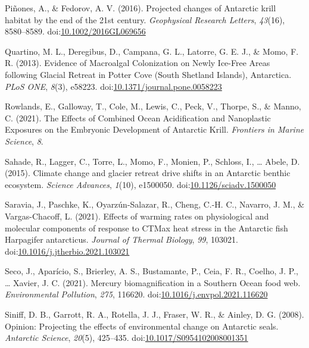 \documentclass[
]{article}
\newlength{\cslhangindent}
\newenvironment{CSLReferences}[2] %
 {\begin{list}{}{%
  \setlength{\itemindent}{0pt}
  \setlength{\leftmargin}{0pt}
  \setlength{\parsep}{0pt}
  \ifodd #1
   \setlength{\leftmargin}{\cslhangindent}
   \setlength{\itemindent}{-1\cslhangindent}
  \fi
  \setlength{\itemsep}{#2\baselineskip}}}
 {\end{list}}
\begin{document}
\begin{CSLReferences}{1}{0}
Piñones, A., \& Fedorov, A. V. (2016). Projected changes of {Antarctic}
krill habitat by the end of the 21st century. \emph{Geophysical Research
Letters}, \emph{43}(16), 8580--8589.
doi:\href{https://doi.org/10.1002/2016GL069656}{10.1002/2016GL069656}

Quartino, M. L., Deregibus, D., Campana, G. L., Latorre, G. E. J., \&
Momo, F. R. (2013). Evidence of {Macroalgal Colonization} on {Newly
Ice-Free Areas} following {Glacial Retreat} in {Potter Cove} ({South
Shetland Islands}), {Antarctica}. \emph{PLoS ONE}, \emph{8}(3), e58223.
doi:\href{https://doi.org/10.1371/journal.pone.0058223}{10.1371/journal.pone.0058223}

Rowlands, E., Galloway, T., Cole, M., Lewis, C., Peck, V., Thorpe, S.,
\& Manno, C. (2021). The {Effects} of {Combined Ocean Acidification} and
{Nanoplastic Exposures} on the {Embryonic Development} of {Antarctic
Krill}. \emph{Frontiers in Marine Science}, \emph{8}.

Sahade, R., Lagger, C., Torre, L., Momo, F., Monien, P., Schloss, I.,
\ldots{} Abele, D. (2015). Climate change and glacier retreat drive
shifts in an {Antarctic} benthic ecosystem. \emph{Science Advances},
\emph{1}(10), e1500050.
doi:\href{https://doi.org/10.1126/sciadv.1500050}{10.1126/sciadv.1500050}

Saravia, J., Paschke, K., Oyarzún-Salazar, R., Cheng, C.-H. C., Navarro,
J. M., \& Vargas-Chacoff, L. (2021). Effects of warming rates on
physiological and molecular components of response to {CTMax} heat
stress in the {Antarctic} fish {Harpagifer} antarcticus. \emph{Journal
of Thermal Biology}, \emph{99}, 103021.
doi:\href{https://doi.org/10.1016/j.jtherbio.2021.103021}{10.1016/j.jtherbio.2021.103021}

Seco, J., Aparício, S., Brierley, A. S., Bustamante, P., Ceia, F. R.,
Coelho, J. P., \ldots{} Xavier, J. C. (2021). Mercury biomagnification
in a {Southern Ocean} food web. \emph{Environmental Pollution},
\emph{275}, 116620.
doi:\href{https://doi.org/10.1016/j.envpol.2021.116620}{10.1016/j.envpol.2021.116620}

Siniff, D. B., Garrott, R. A., Rotella, J. J., Fraser, W. R., \& Ainley,
D. G. (2008). Opinion: {Projecting} the effects of environmental change
on {Antarctic} seals. \emph{Antarctic Science}, \emph{20}(5), 425--435.
doi:\href{https://doi.org/10.1017/S0954102008001351}{10.1017/S0954102008001351}


\end{CSLReferences}
\end{document}
